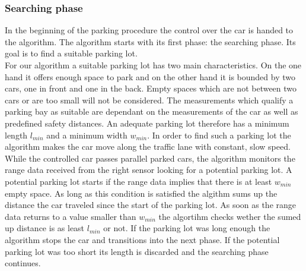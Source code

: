 \documentclass[paper=a4, fontsize=11pt]{scrreprt}
\begin{document}
\subsubsection{Searching phase} \label{seraching_phase}
In the beginning of the parking procedure the control over the car is handed to the algorithm. The algorithm starts with its first phase: the searching phase. Its goal is to find a suitable parking lot.\\
For our algorithm a suitable parking lot has two main characteristics. On the one hand it offers enough space to park and on the other hand it is bounded by two cars, one in front and one in the back. Empty spaces which are not between two cars or are too small will not be considered. The measurements which qualify a parking bay as suitable are dependant on the measurements of the car as well as predefined safety distances. An adequate parking lot therefore has a minimum length $l_{min}$ and a minimum width $w_{min}$. In order to find such a parking lot the algorithm makes the car move along the traffic lane with constant, slow  speed.  While the controlled car passes parallel parked cars, the algorithm monitors the range data received from the right sensor looking for a potential parking lot. A potential parking lot starts if the range data implies that there is at least $w_{min}$ empty space. As long as this condition is satisfied the algithm sums up the distance the car traveled since the start of the parking lot. As soon as the range data returns to a value smaller than $w_{min}$ the algortihm checks wether the sumed up distance is as least $l_{min}$ or not. If the parking lot was long enough the algorithm stops the car and transitions into the next phase. If the potential parking lot was too short its length is discarded and the searching phase continues.
\end{document}

